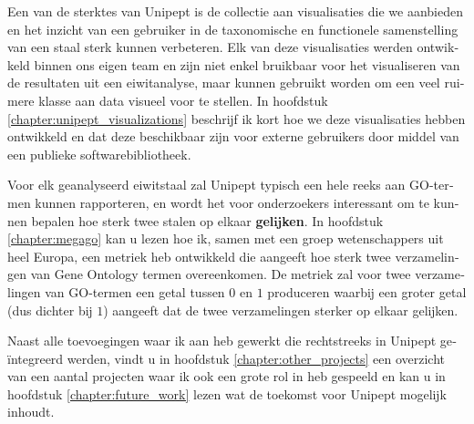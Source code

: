 \begin{otherlanguage}{dutch}
Een van de sterktes van Unipept is de collectie aan visualisaties die we aanbieden en het inzicht van een gebruiker in de taxonomische en functionele samenstelling van een staal sterk kunnen verbeteren.
Elk van deze visualisaties werden ontwikkeld binnen ons eigen team en zijn niet enkel bruikbaar voor het visualiseren van de resultaten uit een eiwitanalyse, maar kunnen gebruikt worden om een veel ruimere klasse aan data visueel voor te stellen.
In hoofdstuk \ref{chapter:unipept_visualizations} beschrijf ik kort hoe we deze visualisaties hebben ontwikkeld en dat deze beschikbaar zijn voor externe gebruikers door middel van een publieke softwarebibliotheek.

Voor elk geanalyseerd eiwitstaal zal Unipept typisch een hele reeks aan GO-termen kunnen rapporteren, en wordt het voor onderzoekers interessant om te kunnen bepalen hoe sterk twee stalen op elkaar \textbf{gelijken}.
In hoofdstuk \ref{chapter:megago} kan u lezen hoe ik, samen met een groep wetenschappers uit heel Europa, een metriek heb ontwikkeld die aangeeft hoe sterk twee verzamelingen van Gene Ontology termen overeenkomen.
De metriek zal voor twee verzamelingen van GO-termen een getal tussen $0$ en $1$ produceren waarbij een groter getal (dus dichter bij $1$) aangeeft dat de twee verzamelingen sterker op elkaar gelijken.

Naast alle toevoegingen waar ik aan heb gewerkt die rechtstreeks in Unipept geïntegreerd werden, vindt u in hoofdstuk \ref{chapter:other_projects} een overzicht van een aantal projecten waar ik ook een grote rol in heb gespeeld en kan u in hoofdstuk \ref{chapter:future_work} lezen wat de toekomst voor Unipept mogelijk inhoudt.

\end{otherlanguage}
